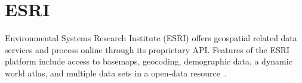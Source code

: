 \section{ESRI}

Environmental Systems Research Institute (ESRI) offers geospatial related data
services and process online through its proprietary API.  Features of the ESRI
platform include access to basemaps, geocoding, demographic data, a dynamic
world atlas, and multiple data sets in a open-data resource~\cite{hid-sp18-505-ESRI2018}.

